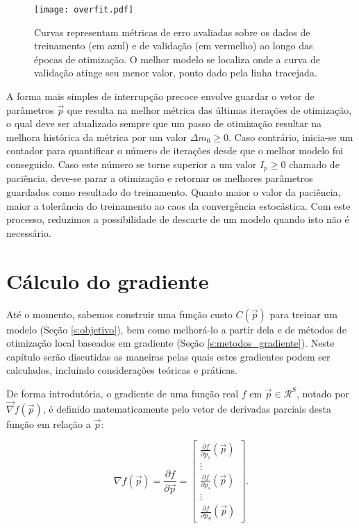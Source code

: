     \begin{figure}
      \begin{center}
        \texttt{[image: overfit.pdf]}
      \end{center}
      \caption{Curvas representam métricas de erro avaliadas sobre os dados de treinamento (em azul) e de validação (em vermelho) ao longo das épocas de otimização. O melhor modelo se localiza onde a curva de validação atinge seu menor valor, ponto dado pela linha tracejada.}
      \label{f:overfit}
    \end{figure}

    A forma mais simples de interrupção precoce envolve guardar o vetor de parâmetros $\vec{p}$ que resulta na melhor métrica das últimas iterações de otimização, o qual deve ser atualizado sempre que um passo de otimização resultar na melhora histórica da métrica por um valor $\Delta m_0 \geq 0$. Caso contrário, inicia-se um contador para quantificar o número de iterações desde que o melhor modelo foi conseguido. Caso este número se torne superior a um valor $I_p \geq 0$ chamado de paciência, deve-se parar a otimização e retornar os melhores parâmetros guardados como resultado do treinamento. Quanto maior o valor da paciência, maior a tolerância do treinamento ao caos da convergência estocástica. Com este processo, reduzimos a possibilidade de descarte de um modelo quando isto não é necessário.


\chapter{Cálculo do gradiente} \label{c:gradiente_calculo}

  Até o momento, sabemos construir uma função custo $C(\vec{p})$ para treinar um modelo (Seção \ref{s:objetivo}), bem como melhorá-lo a partir dela e de métodos de otimização local baseados em gradiente (Seção \ref{s:metodos_gradiente}). Neste capítulo serão discutidas as maneiras pelas quais estes gradientes podem ser calculados, incluindo considerações teóricas e práticas.

  De forma introdutória, o gradiente de uma função real $f$ em $\vec{p} \in \mathcal{R}^S$, notado por $\vec{\nabla} f(\vec{p})$, é definido matematicamente pelo vetor de derivadas parciais desta função em relação a $\vec{p}$:

  \begin{equation} \label{e:gradiente_definicao}
    \nabla f(\vec{p}) =
    \dfrac{\partial f}{\partial \vec{p}} =
    \begin{bmatrix}
      \frac{\partial f}{\partial p_1}(\vec{p}) \\
      \vdots \\
      \frac{\partial f}{\partial p_s}(\vec{p}) \\
      \vdots \\
      \frac{\partial f}{\partial p_S}(\vec{p})
    \end{bmatrix}
    .
  \end{equation}


